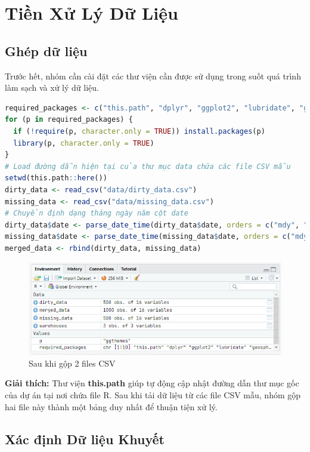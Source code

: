 \section{Tiền Xử Lý Dữ Liệu}
\subsection{Ghép dữ liệu}
\noindent
Trước hết, nhóm cần cài đặt các thư viện cần được sử dụng trong suốt quá trình làm sạch và xử lý dữ liệu.

\begin{lstlisting}[language=R, caption=Ghép dữ liệu trong R]
required_packages <- c("this.path", "dplyr", "ggplot2", "lubridate", "geosphere", "readr", "corrplot", "faraway", "car", "ggthemes","gt","nortest","knitr","FSA","ggcorrplot","dunn.test")
for (p in required_packages) {
  if (!require(p, character.only = TRUE)) install.packages(p)
  library(p, character.only = TRUE)
}
# Load đường dẫn hiện tại của thư mục data chứa các file CSV mẫu
setwd(this.path::here())
dirty_data <- read_csv("data/dirty_data.csv")
missing_data <- read_csv("data/missing_data.csv")
# Chuyển định dạng tháng ngày năm cột date
dirty_data$date <- parse_date_time(dirty_data$date, orders = c("mdy", "ymd", "dmy"))
missing_data$date <- parse_date_time(missing_data$date, orders = c("mdy", "ymd", "dmy"))
merged_data <- rbind(dirty_data, missing_data)
\end{lstlisting}

\begin{figure}[!ht]
    \centering \includegraphics{Images/img/4.0_prepare_data/4.0_after_merge_files.PNG}
    \caption{Sau khi gộp 2 files CSV}
\end{figure}
\begin{boxH}
\textbf{Giải thích:} Thư viện \textbf{this.path} giúp tự động cập nhật đường dẫn thư mục gốc của dự án tại nơi chứa file R. Sau khi tải dữ liệu từ các file CSV mẫu, nhóm gộp hai file này thành một bảng duy nhất để thuận tiện xử lý.    
\end{boxH}
\subsection{Xác định Dữ liệu Khuyết}

